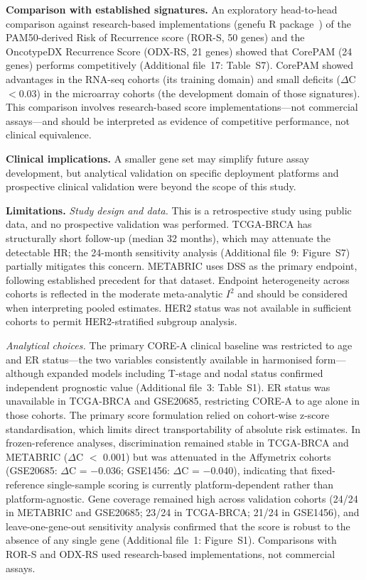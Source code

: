 \documentclass[pdflatex,sn-vancouver-num]{sn-jnl}
\begin{document}
\textbf{Comparison with established signatures.} An exploratory head-to-head comparison against research-based implementations (genefu R package~\cite{gendoo2016}) of the PAM50-derived Risk of Recurrence score (ROR-S, 50 genes) and the OncotypeDX Recurrence Score (ODX-RS, 21 genes) showed that CorePAM (24 genes) performs competitively (Additional file~17: Table~S7). CorePAM showed advantages in the RNA-seq cohorts (its training domain) and small deficits ($\Delta$C $< 0.03$) in the microarray cohorts (the development domain of those signatures). This comparison involves research-based score implementations---not commercial assays---and should be interpreted as evidence of competitive performance, not clinical equivalence.

\textbf{Clinical implications.} A smaller gene set may simplify future assay development, but analytical validation on specific deployment platforms and prospective clinical validation were beyond the scope of this study.

\textbf{Limitations.} \textit{Study design and data.} This is a retrospective study using public data, and no prospective validation was performed. TCGA-BRCA has structurally short follow-up (median 32 months), which may attenuate the detectable HR; the 24-month sensitivity analysis (Additional file~9: Figure~S7) partially mitigates this concern. METABRIC uses DSS as the primary endpoint, following established precedent for that dataset. Endpoint heterogeneity across cohorts is reflected in the moderate meta-analytic $I^2$ and should be considered when interpreting pooled estimates. HER2 status was not available in sufficient cohorts to permit HER2-stratified subgroup analysis.

\textit{Analytical choices.} The primary CORE-A clinical baseline was restricted to age and ER status---the two variables consistently available in harmonised form---although expanded models including T-stage and nodal status confirmed independent prognostic value (Additional file~3: Table~S1). ER status was unavailable in TCGA-BRCA and GSE20685, restricting CORE-A to age alone in those cohorts. The primary score formulation relied on cohort-wise z-score standardisation, which limits direct transportability of absolute risk estimates. In frozen-reference analyses, discrimination remained stable in TCGA-BRCA and METABRIC ($\Delta$C $<$ 0.001) but was attenuated in the Affymetrix cohorts (GSE20685: $\Delta$C = $-$0.036; GSE1456: $\Delta$C = $-$0.040), indicating that fixed-reference single-sample scoring is currently platform-dependent rather than platform-agnostic. Gene coverage remained high across validation cohorts (24/24 in METABRIC and GSE20685; 23/24 in TCGA-BRCA; 21/24 in GSE1456), and leave-one-gene-out sensitivity analysis confirmed that the score is robust to the absence of any single gene (Additional file~1: Figure~S1). Comparisons with ROR-S and ODX-RS used research-based implementations, not commercial assays.
\end{document}
